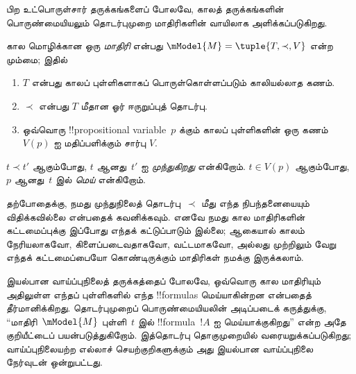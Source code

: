 \documentclass[../../../include/open-logic-section]{subfiles}
\begin{document}
பிற உட்பொருள்சார் தருக்கங்களைப் போலவே, காலத் தருக்கங்களின் பொருண்மையியலும்
தொடர்புமுறை மாதிரிகளின் வாயிலாக அளிக்கப்படுகிறது.

\begin{defn}
  கால மொழிக்கான ஒரு \emph{மாதிரி} என்பது
  $\mModel{M} = \tuple{T, \prec, V}$ என்ற மும்மை; இதில்
  \begin{enumerate}
  \item $T$ என்பது காலப் புள்ளிகளாகப் பொருள்கொள்ளப்படும் காலியல்லாத கணம்.
  \item $\prec$ என்பது $T$ மீதான ஓர் ஈருறுப்புத் தொடர்பு.
  \item ஒவ்வொரு !!{propositional variable}~$p$ க்கும் காலப் புள்ளிகளின்
    ஒரு கணம் $V(p)$ ஐ மதிப்பளிக்கும் சார்பு $V$.
  \end{enumerate}
  $t \prec t'$ ஆகும்போது, $t$ ஆனது~$t'$ ஐ \emph{முந்துகிறது} என்கிறோம்.
  $t \in V(p)$ ஆகும்போது, $p$ ஆனது~$t$ இல் \emph{மெய்} என்கிறோம்.
\end{defn}

தற்போதைக்கு, நமது முந்துநிலைத் தொடர்பு~$\prec$ மீது எந்த நிபந்தனையையும்
விதிக்கவில்லை என்பதைக் கவனிக்கவும். எனவே நமது கால மாதிரிகளின் கட்டமைப்புக்கு
இப்போது எந்தக் கட்டுப்பாடும் இல்லை; ஆகையால் காலம் நேரியலாகவோ,
கிளைப்படைவதாகவோ, வட்டமாகவோ, அல்லது முற்றிலும் வேறு எந்தக் கட்டமைப்பையோ
கொண்டிருக்கும் மாதிரிகள் நமக்கு இருக்கலாம்.

இயல்பான வாய்ப்புநிலைத் தருக்கத்தைப் போலவே, ஒவ்வொரு கால மாதிரியும் அதிலுள்ள
எந்தப் புள்ளிகளில் எந்த !!{formula}s மெய்யாகின்றன என்பதைத்
தீர்மானிக்கிறது. தொடர்புமுறைப் பொருண்மையியலின் அடிப்படைக் கருத்துக்கு,
``மாதிரி~$\mModel{M}$ புள்ளி~$t$ இல் !!{formula}~$!A$ ஐ மெய்யாக்குகிறது''
என்ற அதே குறியீட்டைப் பயன்படுத்துகிறோம். இத்தொடர்பு தொகுமுறையில்
வரையறுக்கப்படுகிறது; வாய்ப்புநிலையற்ற எல்லாச் செயற்குறிகளுக்கும் அது இயல்பான
வாய்ப்புநிலை நேர்வுடன் ஒன்றுபட்டது.
\end{document}
